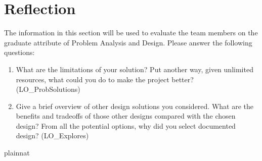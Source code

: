 \documentclass[12pt, titlepage]{article}
\begin{document}
\newpage{}

\appendix

\section{Reflection}

The information in this section will be used to evaluate the team members on the
graduate attribute of Problem Analysis and Design.  Please answer the following questions:

\begin{enumerate}
  \item What are the limitations of your solution?  Put another way, given
  unlimited resources, what could you do to make the project better? (LO\_ProbSolutions)
  \item Give a brief overview of other design solutions you considered.  What
  are the benefits and tradeoffs of those other designs compared with the chosen
  design?  From all the potential options, why did you select documented design?
  (LO\_Explores)
\end{enumerate}

\newpage
 {plainnat}


\newpage{}
\end{document}
